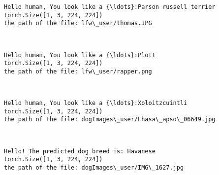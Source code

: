 \documentclass[11pt]{article}
\begin{document}
    \begin{Verbatim}[commandchars=\\\{\}]
Hello human, You look like a {\ldots}:Parson russell terrier
torch.Size([1, 3, 224, 224])
the path of the file: lfw\_user/thomas.JPG

    \end{Verbatim}

    \begin{center}
    \end{center}
    { \hspace*{\fill} \\}
    
    \begin{Verbatim}[commandchars=\\\{\}]
Hello human, You look like a {\ldots}:Plott
torch.Size([1, 3, 224, 224])
the path of the file: lfw\_user/rapper.png

    \end{Verbatim}

    \begin{center}
    \end{center}
    { \hspace*{\fill} \\}
    
    \begin{Verbatim}[commandchars=\\\{\}]
Hello human, You look like a {\ldots}:Xoloitzcuintli
torch.Size([1, 3, 224, 224])
the path of the file: dogImages\_user/Lhasa\_apso\_06649.jpg

    \end{Verbatim}

    \begin{center}
    \end{center}
    { \hspace*{\fill} \\}
    
    \begin{Verbatim}[commandchars=\\\{\}]
Hello! The predicted dog breed is: Havanese
torch.Size([1, 3, 224, 224])
the path of the file: dogImages\_user/IMG\_1627.jpg

    \end{Verbatim}
\end{document}
